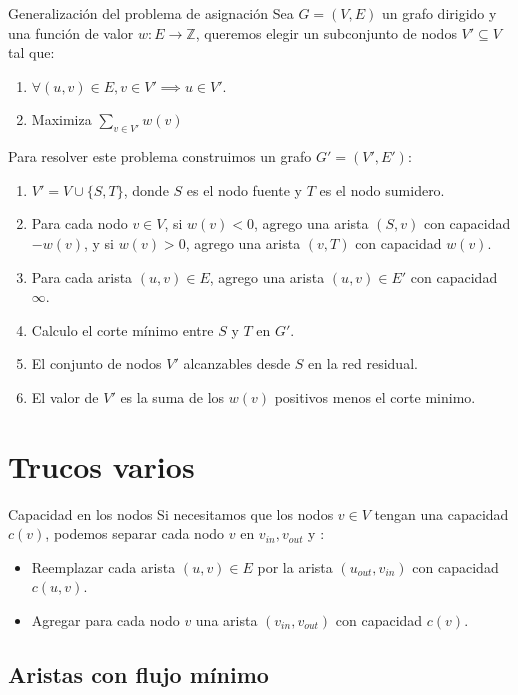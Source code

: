 \documentclass{beamer}
\begin{document}
\begin{frame}{Generalización del problema de asignación}
    Sea $G = (V,E)$ un grafo dirigido y una función de valor $w:E \to \mathbb{Z}$, queremos elegir un subconjunto de nodos $V' \subseteq V$ tal que:
    \begin{enumerate}
        \item $\forall (u,v) \in E, v \in V' \implies u \in V'$.
        \item Maximiza $\sum_{v \in V'} w(v)$
    \end{enumerate}

    \pause
    Para resolver este problema construimos un grafo $G' = (V', E')$:
    \begin{enumerate}
        \item $V' = V \cup \{S, T\}$, donde $S$ es el nodo fuente y $T$ es el nodo sumidero.
        \pause
        \item Para cada nodo $v \in V$, si $w(v) < 0$, agrego una arista $(S,v)$ con capacidad $-w(v)$, y si $w(v) > 0$, agrego una arista $(v,T)$ con capacidad $w(v)$.
        \pause
        \item Para cada arista $(u,v) \in E$, agrego una arista $(u,v) \in E'$ con capacidad $\infty$.
        \pause
        \item Calculo el corte mínimo entre $S$ y $T$ en $G'$.
        \pause
        \item El conjunto de nodos $V'$ alcanzables desde $S$ en la red residual.
        \item El valor de $V'$ es la suma de los $w(v)$ positivos menos el corte minimo.
    \end{enumerate}

\end{frame}

\section{ Trucos varios }

\begin{frame}{Capacidad en los nodos}
    Si necesitamos que los nodos $v \in V$ tengan una capacidad $c(v)$, podemos separar cada nodo $v$ en $v_{in}, v_{out}$ y :
    \begin{itemize}
        \item Reemplazar cada arista $(u,v) \in E$ por la arista $(u_{out}, v_{in})$ con capacidad $c(u,v)$.
        \item Agregar para cada nodo $v$ una arista $(v_{in}, v_{out})$ con capacidad $c(v)$. 
    \end{itemize}
\end{frame}
    
\subsection{ Aristas con flujo mínimo }
\end{document}
